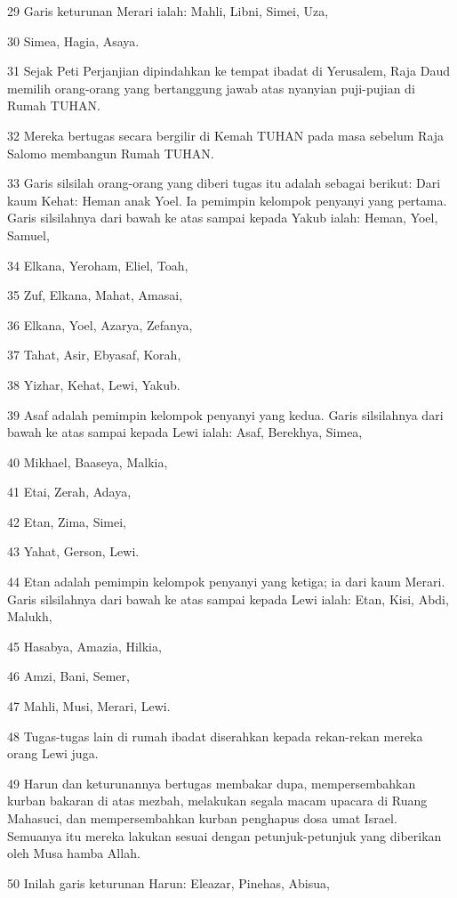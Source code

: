 \par 29 Garis keturunan Merari ialah: Mahli, Libni, Simei, Uza,
\par 30 Simea, Hagia, Asaya.
\par 31 Sejak Peti Perjanjian dipindahkan ke tempat ibadat di Yerusalem, Raja Daud memilih orang-orang yang bertanggung jawab atas nyanyian puji-pujian di Rumah TUHAN.
\par 32 Mereka bertugas secara bergilir di Kemah TUHAN pada masa sebelum Raja Salomo membangun Rumah TUHAN.
\par 33 Garis silsilah orang-orang yang diberi tugas itu adalah sebagai berikut: Dari kaum Kehat: Heman anak Yoel. Ia pemimpin kelompok penyanyi yang pertama. Garis silsilahnya dari bawah ke atas sampai kepada Yakub ialah: Heman, Yoel, Samuel,
\par 34 Elkana, Yeroham, Eliel, Toah,
\par 35 Zuf, Elkana, Mahat, Amasai,
\par 36 Elkana, Yoel, Azarya, Zefanya,
\par 37 Tahat, Asir, Ebyasaf, Korah,
\par 38 Yizhar, Kehat, Lewi, Yakub.
\par 39 Asaf adalah pemimpin kelompok penyanyi yang kedua. Garis silsilahnya dari bawah ke atas sampai kepada Lewi ialah: Asaf, Berekhya, Simea,
\par 40 Mikhael, Baaseya, Malkia,
\par 41 Etai, Zerah, Adaya,
\par 42 Etan, Zima, Simei,
\par 43 Yahat, Gerson, Lewi.
\par 44 Etan adalah pemimpin kelompok penyanyi yang ketiga; ia dari kaum Merari. Garis silsilahnya dari bawah ke atas sampai kepada Lewi ialah: Etan, Kisi, Abdi, Malukh,
\par 45 Hasabya, Amazia, Hilkia,
\par 46 Amzi, Bani, Semer,
\par 47 Mahli, Musi, Merari, Lewi.
\par 48 Tugas-tugas lain di rumah ibadat diserahkan kepada rekan-rekan mereka orang Lewi juga.
\par 49 Harun dan keturunannya bertugas membakar dupa, mempersembahkan kurban bakaran di atas mezbah, melakukan segala macam upacara di Ruang Mahasuci, dan mempersembahkan kurban penghapus dosa umat Israel. Semuanya itu mereka lakukan sesuai dengan petunjuk-petunjuk yang diberikan oleh Musa hamba Allah.
\par 50 Inilah garis keturunan Harun: Eleazar, Pinehas, Abisua,
